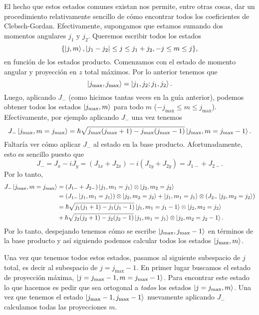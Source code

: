 \documentclass[10pt, a4paper]{article}
\newcommand{\jpmprefactev}[2]{\hbar\sqrt{{#1} - {#2}}}
\newcommand{\jmax}{j_{\text{max}}}
\numberwithin{equation}{subsection}
\begin{document}
El hecho que estos estados comunes existan nos permite, entre otras cosas, dar
un procedimiento relativamente sencillo de cómo encontrar todos los
coeficientes de Clebsch-Gordan. Efectivamente, supongamos que estamos sumando
dos momentos angulares $j_1$ y $j_2$. Queremos escribir todos los estados
\begin{equation}
  \set{\ket{j,m}, \abs{j_1 - j_2} \leq j \leq j_1 + j_2, -j \leq m \leq j},
\end{equation}
en función de los estados producto. Comenzamos con el estado de momento angular
y proyección en $z$ total máximos. Por lo anterior tenemos que
\begin{equation}
  \ket{\jmax, \jmax} = \ket{j_1,j_2; j_1, j_2}.
\end{equation}
Luego, aplicando $J_-$ (como hicimos tantas veces en la guía anterior), podemos
obtener todos los estados $\ket{\jmax, m}$ para todo $m$ ($-\jmax \leq m \leq
\jmax$). Efectivamente, por ejemplo aplicando $J_-$ una vez tenemos
\begin{equation}
  J_-\ket{\jmax, m = \jmax} = \jpmprefactev{\jmax(\jmax+1)}{\jmax(\jmax-1)}
  \ket{\jmax, m = \jmax - 1}.
\end{equation}
Faltaría ver cómo aplicar $J_-$ al estado en la base producto. Afortunadamente,
esto es sencillo puesto que
\begin{equation}
  J_- = J_x - iJ_y = (J_{1x} + J_{2x}) -i(J_{1y} + J_{2y}) = J_{1-} + J_{2-}.
\end{equation}
Por lo tanto,
\begin{align}
  J_-\ket{\jmax, m = \jmax} &=
    \left(J_{1-} + J_{2-}\right)\ket{j_1,m_1=j_1}\tensor\ket{j_2,m_2=j_2} \\
  &= \left(J_{1-}\ket{j_1,m_1=j_1}\right)\tensor\ket{j_2,m_2=j_2}
    + \ket{j_1,m_1=j_1}\tensor\left(J_{2-}\ket{j_2,m_2=j_2}\right) \\
  &= \jpmprefactev{j_1(j_1+1)}{j_1(j_1-1)}
    \ket{j_1,m_1=j_1-1}\tensor\ket{j_2,m_2=j_2} \\
  &+ \jpmprefactev{j_2(j_2+1)}{j_2(j_2-1)}
    \ket{j_1,m_1=j_1}\tensor\ket{j_2,m_2=j_2-1}.
\end{align}
Por lo tanto, despejando tenemos cómo se escribe $\ket{\jmax, \jmax-1}$ en
términos de la base producto y así siguiendo podemos calcular todos los estados
$\ket{\jmax,m}$.

Una vez que tenemos todos estos estados, pasamos al siguiente subespacio de $j$
total, es decir al subespacio de $j = \jmax - 1$. En primer lugar buscamos el
estado de proyección máxima, $\ket{j = \jmax - 1, m = \jmax - 1}$. Para
encontrar este estado lo que hacemos es pedir que sea ortogonal a \emph{todos}
los estados $\ket{j = \jmax, m}$. Una vez que tenemos el estado $\ket{\jmax -
1, \jmax - 1}$ nuevamente aplicando $J_-$ calculamos todas las proyecciones
$m$.
\end{document}
